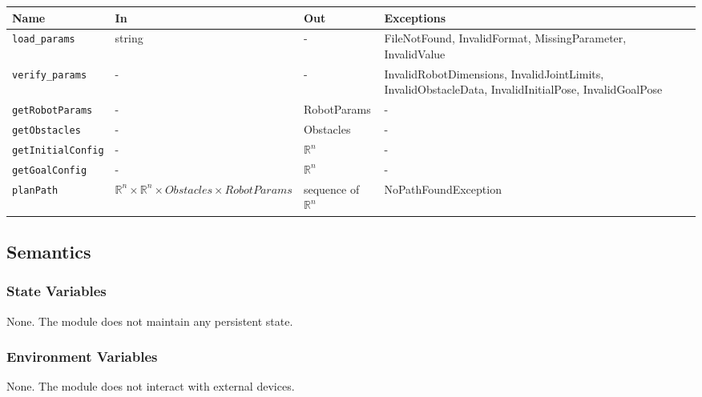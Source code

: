 \documentclass[12pt, titlepage]{article}
\begin{document}
\begin{center}
  \renewcommand{\arraystretch}{1.4}
  \begin{tabular}{p{3.5cm} p{3cm} p{4cm} p{4cm}}
  \toprule
  \textbf{Name} & \textbf{In} & \textbf{Out} & \textbf{Exceptions} \\
  \midrule
  \texttt{load\_params} & string & - & FileNotFound, InvalidFormat, MissingParameter, InvalidValue \\[4pt]
  
  \texttt{verify\_params} & - & - & InvalidRobotDimensions, InvalidJointLimits, InvalidObstacleData, InvalidInitialPose, InvalidGoalPose \\[4pt]
  
  \texttt{getRobotParams} & - & RobotParams & - \\[4pt]
  
  \texttt{getObstacles} & - & Obstacles & - \\[4pt]
  
  \texttt{getInitialConfig} & - & $\mathbb{R}^n$ & - \\[4pt]
  
  \texttt{getGoalConfig} & - & $\mathbb{R}^n$ & - \\[4pt]
  
  \texttt{planPath} & $\mathbb{R}^n \times \mathbb{R}^n \times Obstacles \times RobotParams$ & sequence of $\mathbb{R}^n$ & NoPathFoundException \\
  
  \bottomrule
  \end{tabular}
  \end{center}

  

\subsection{Semantics}

\subsubsection{State Variables}

None. The module does not maintain any persistent state.

\subsubsection{Environment Variables}

None. The module does not interact with external devices.
\end{document}
